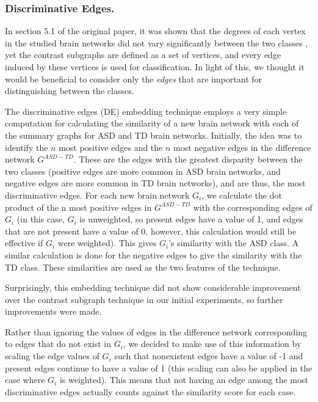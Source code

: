 \documentclass[sigconf]{acmart}
\begin{document}
\subsubsection{Discriminative Edges.}
In section 5.1 of the original paper, it was shown that the degrees of each vertex in the studied brain networks did not vary significantly between the two classes \cite{lanciano2020}, yet the contrast subgraphs are defined as a set of vertices, and every edge induced by these vertices is used for classification.
In light of this, we thought it would be beneficial to consider only the \emph{edges} that are important for distinguishing between the classes.

The discriminative edges (DE) embedding technique employs a very simple computation for calculating the similarity of a new brain network with each of the summary graphs for ASD and TD brain networks.
Initially, the idea was to identify the $n$ most positive edges and the $n$ most negative edges in the difference network $G^{ASD - TD}$.
These are the edges with the greatest disparity between the two classes (positive edges are more common in ASD brain networks, and negative edges are more common in TD brain networks), and are thus, the most discriminative edges.
For each new brain network $G_i$, we calculate the dot product of the n most positive edges in $G^{ASD - TD}$ with the corresponding edges of $G_i$ (in this case, $G_i$ is unweighted, so present edges have a value of 1, and edges that are not present have a value of 0, however, this calculation would still be effective if $G_i$ were weighted).
This gives $G_i$'s similarity with the ASD class.
A similar calculation is done for the negative edges to give the similarity with the TD class.
These similarities are used as the two features of the technique.

Surprisingly, this embedding technique did not show considerable improvement over the contrast subgraph technique in our initial experiments, so further improvements were made.

Rather than ignoring the values of edges in the difference network corresponding to edges that do not exist in $G_i$, we decided to make use of this information by scaling the edge values of $G_i$ such that nonexistent edges have a value of -1 and present edges continue to have a value of 1 (this scaling can also be applied in the case where $G_i$ is weighted).
This means that not having an edge among the most discriminative edges actually counts against the similarity score for each case.
\end{document}
